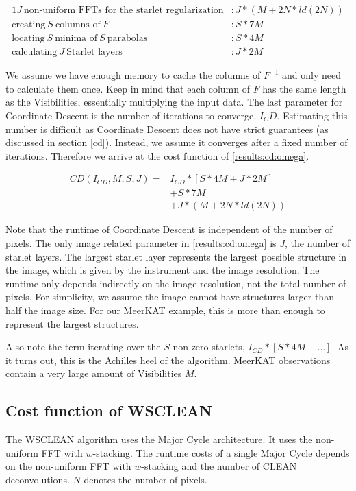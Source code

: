\begin{alignat*}{1}
J\: \text{non-uniform FFTs for the starlet regularization} &: J*(M + 2N*ld(2N))\\
\text{creating} \:S\: \text{columns of}\: F &: S*7M\\
\text{locating} \:S\: \text{minima of} \:S\: \text{parabolas} &: S*4M\\
\text{calculating} \:J\: \text{Starlet layers} &: J * 2M
\end{alignat*}

We assume we have enough memory to cache the columns of $F^{-1}$ and only need to calculate them once. Keep in mind that each column of $F$ has the same length as the Visibilities, essentially multiplying the input data. The last parameter for Coordinate Descent is the number of iterations to converge, $I_CD$. Estimating this number is difficult as Coordinate Descent does not have strict guarantees (as discussed in section \ref{cd}). Instead, we assume it converges after a fixed number of iterations. Therefore we arrive at the cost function of \eqref{results:cd:omega}.

\begin{equation}\label{results:cd:omega}
\begin{aligned}
	CD(I_{CD}, M, S, J) = &I_{CD} * [S * 4M + J * 2M]\\
		&+  S*7M\\
		&+ J*(M + 2N*ld(2N))
\end{aligned}
\end{equation}

Note that the runtime of Coordinate Descent is independent of the number of pixels. The only image related parameter in \eqref{results:cd:omega} is $J$, the number of starlet layers. The largest starlet layer represents the largest possible structure in the image, which is given by the instrument and the image resolution. The runtime only depends indirectly on the image resolution, not the total number of pixels. For simplicity, we assume the image cannot have structures larger than half the image size. For our MeerKAT example, this is more than enough to represent the largest structures.

Also note the term iterating over the $S$ non-zero starlets, $ I_{CD} * [S * 4M +\ldots]$. As it turns out, this is the Achilles heel of the algorithm. MeerKAT observations contain a very large amount of Visibilities $M$.

\subsection{Cost function of WSCLEAN}
The WSCLEAN algorithm uses the Major Cycle architecture. It uses the non-uniform FFT with $w$-stacking. The runtime costs of a single Major Cycle depends on the non-uniform FFT with $w$-stacking and the number of CLEAN deconvolutions. $N$ denotes the number of pixels.

